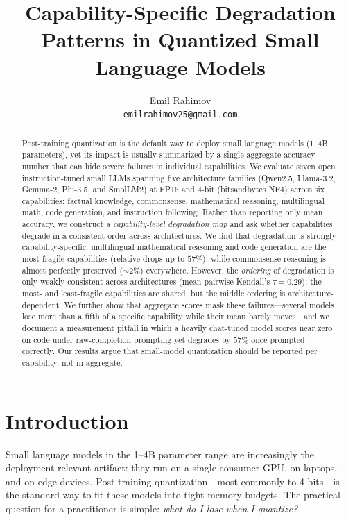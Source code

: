 \documentclass[11pt]{article}
\title{Capability-Specific Degradation Patterns in Quantized Small Language Models}
\author{Emil Rahimov \\ \texttt{emilrahimov25@gmail.com}}
\begin{document}
\maketitle

\begin{abstract}
Post-training quantization is the default way to deploy small language models
(1--4B parameters), yet its impact is usually summarized by a single aggregate
accuracy number that can hide severe failures in individual capabilities. We
evaluate seven open instruction-tuned small LLMs spanning five architecture
families (Qwen2.5, Llama-3.2, Gemma-2, Phi-3.5, and SmolLM2) at FP16 and 4-bit
(bitsandbytes NF4) across six capabilities: factual knowledge, commonsense,
mathematical reasoning, multilingual math, code generation, and instruction
following. Rather than reporting only mean accuracy, we construct a
\emph{capability-level degradation map} and ask whether capabilities degrade in a
consistent order across architectures. We find that degradation is strongly
capability-specific: multilingual mathematical reasoning and code generation are
the most fragile capabilities (relative drops up to $57\%$), while commonsense
reasoning is almost perfectly preserved ($\sim$2\%) everywhere. However, the
\emph{ordering} of degradation is only weakly consistent across architectures
(mean pairwise Kendall's $\tau = 0.29$): the most- and least-fragile capabilities
are shared, but the middle ordering is architecture-dependent. We further show
that aggregate scores mask these failures---several models lose more than a fifth
of a specific capability while their mean barely moves---and we document a
measurement pitfall in which a heavily chat-tuned model scores near zero on code
under raw-completion prompting yet degrades by $57\%$ once prompted correctly. Our
results argue that small-model quantization should be reported per capability,
not in aggregate.
\end{abstract}

\section{Introduction}

Small language models in the 1--4B parameter range are increasingly the
deployment-relevant artifact: they run on a single consumer GPU, on laptops, and
on edge devices. Post-training quantization---most commonly to 4 bits---is the
standard way to fit these models into tight memory budgets. The practical
question for a practitioner is simple: \emph{what do I lose when I quantize?}
\end{document}
